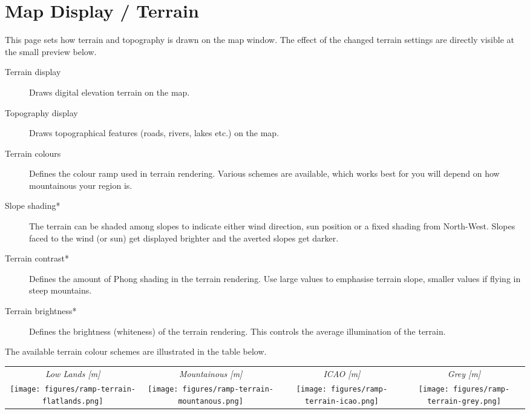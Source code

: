 \section{Map Display / Terrain}\label{sec:terrain-display}

This page sets how terrain and topography is drawn on the map window. The effect of the 
changed terrain settings are directly visible at the small preview below.

\begin{description}
\item[Terrain display]  Draws digital elevation terrain on the map.
\item[Topography display]  Draws topographical features (roads, rivers, lakes etc.) on
  the map.
\item[Terrain colours]  Defines the colour ramp used in terrain rendering.  Various 
  schemes are available, which works best for you will depend on how mountainous your region is.
\item[Slope shading*]  \label{conf:shading} The terrain can be shaded among slopes 
  to indicate either wind direction, sun position or a fixed shading from North-West. 
  Slopes faced to the wind (or sun) get displayed brighter and the averted slopes get darker.
\item[Terrain contrast*]  Defines the amount of Phong shading in the terrain rendering. 
  Use large values to emphasise terrain slope, smaller values if flying in steep mountains.
\item[Terrain brightness*]  Defines the brightness (whiteness) of the terrain rendering. 
  This controls the average illumination of the terrain.
\end{description}


The available terrain colour schemes are illustrated in the table below.

\begin{longtable}{c c c c}
\em{Low Lands [m]} & \em{Mountainous [m]} & \em{ICAO [m]} & \em{Grey [m]} \\
\nopagebreak[4]
\texttt{[image: figures/ramp-terrain-flatlands.png]}&
\texttt{[image: figures/ramp-terrain-mountanous.png]}&
\texttt{[image: figures/ramp-terrain-icao.png]}&
\texttt{[image: figures/ramp-terrain-grey.png]}
\end{longtable}

